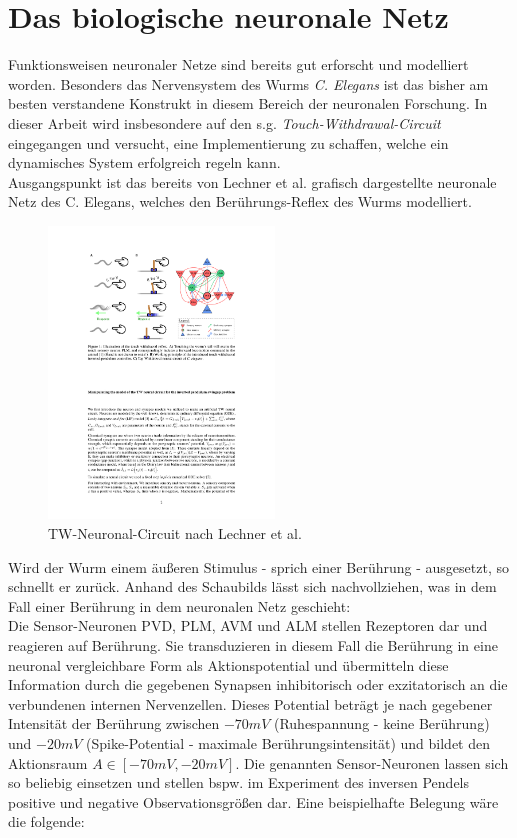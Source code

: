 \section{Das biologische neuronale Netz}
\label{sec:neuro_netz}
	Funktionsweisen neuronaler Netze sind bereits gut erforscht und modelliert worden. Besonders das Nervensystem des Wurms \textit{C. Elegans} \cite{CElegans} ist das bisher am besten verstandene Konstrukt in diesem Bereich der neuronalen Forschung. In dieser Arbeit wird insbesondere auf den s.g. \textit{Touch-Withdrawal-Circuit} eingegangen und versucht, eine Implementierung zu schaffen, welche ein dynamisches System erfolgreich regeln kann.\\
	Ausgangspunkt ist das bereits von Lechner et al. \cite{WormLevelRL} grafisch dargestellte neuronale Netz des C. Elegans, welches den Berührungs-Reflex des Wurms modelliert.
	\begin{figure}[H] %
		\centering
		\includegraphics[width=6cm]{figures/chap_neuron/Orig_TW_Circuit.pdf}
		\caption{TW-Neuronal-Circuit nach Lechner et al. \cite{WormLevelRL}}
		\label{fig:01_TW-Circuit}
	\end{figure}
	Wird der Wurm einem äußeren Stimulus - sprich einer Berührung - ausgesetzt, so schnellt er zurück. Anhand des Schaubilds lässt sich nachvollziehen, was in dem Fall einer Berührung in dem neuronalen Netz geschieht:\\
	Die Sensor-Neuronen PVD, PLM, AVM und ALM stellen Rezeptoren dar und reagieren auf Berührung. Sie transduzieren in diesem Fall die Berührung in eine neuronal vergleichbare Form als Aktionspotential und übermitteln diese Information durch die gegebenen Synapsen inhibitorisch oder exzitatorisch an die verbundenen internen Nervenzellen. Dieses Potential beträgt je nach gegebener Intensität der Berührung zwischen $-70mV$ (Ruhespannung - keine Berührung) und $-20mV$ (Spike-Potential - maximale Berührungsintensität) und bildet den Aktionsraum $A\in[-70mV, -20mV]$. Die genannten Sensor-Neuronen lassen sich so beliebig einsetzen und stellen bspw. im Experiment des inversen Pendels positive und negative Observationsgrößen dar. Eine beispielhafte Belegung wäre die folgende:
